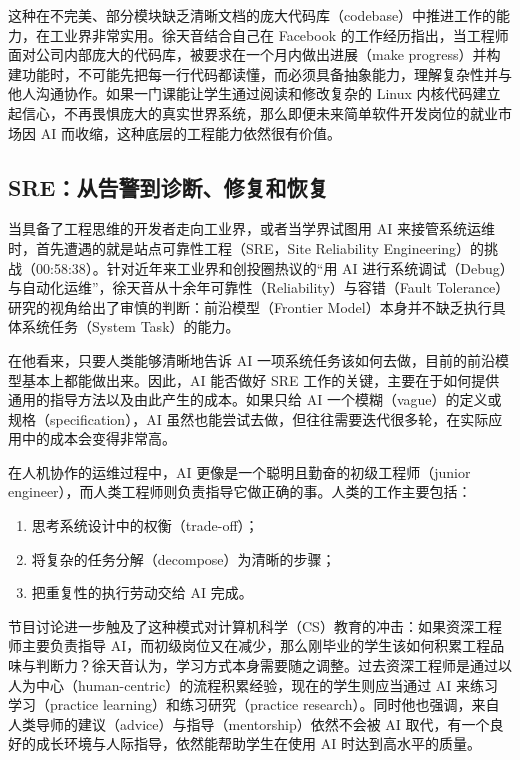 \documentclass[UTF8,a4paper,11pt,fontset=fandol]{ctexart}
\begin{document}
这种在不完美、部分模块缺乏清晰文档的庞大代码库（codebase）中推进工作的能力，在工业界非常实用。徐天音结合自己在 Facebook 的工作经历指出，当工程师面对公司内部庞大的代码库，被要求在一个月内做出进展（make progress）并构建功能时，不可能先把每一行代码都读懂，而必须具备抽象能力，理解复杂性并与他人沟通协作。如果一门课能让学生通过阅读和修改复杂的 Linux 内核代码建立起信心，不再畏惧庞大的真实世界系统，那么即便未来简单软件开发岗位的就业市场因 AI 而收缩，这种底层的工程能力依然很有价值。

\subsection{SRE：从告警到诊断、修复和恢复}
当具备了工程思维的开发者走向工业界，或者当学界试图用 AI 来接管系统运维时，首先遭遇的就是站点可靠性工程（SRE，Site Reliability Engineering）的挑战（00:58:38）。针对近年来工业界和创投圈热议的“用 AI 进行系统调试（Debug）与自动化运维”，徐天音从十余年可靠性（Reliability）与容错（Fault Tolerance）研究的视角给出了审慎的判断：前沿模型（Frontier Model）本身并不缺乏执行具体系统任务（System Task）的能力。

在他看来，只要人类能够清晰地告诉 AI 一项系统任务该如何去做，目前的前沿模型基本上都能做出来。因此，AI 能否做好 SRE 工作的关键，主要在于如何提供通用的指导方法以及由此产生的成本。如果只给 AI 一个模糊（vague）的定义或规格（specification），AI 虽然也能尝试去做，但往往需要迭代很多轮，在实际应用中的成本会变得非常高。

在人机协作的运维过程中，AI 更像是一个聪明且勤奋的初级工程师（junior engineer），而人类工程师则负责指导它做正确的事。人类的工作主要包括：
\begin{enumerate}
\item 思考系统设计中的权衡（trade-off）；
\item 将复杂的任务分解（decompose）为清晰的步骤；
\item 把重复性的执行劳动交给 AI 完成。
\end{enumerate}

节目讨论进一步触及了这种模式对计算机科学（CS）教育的冲击：如果资深工程师主要负责指导 AI，而初级岗位又在减少，那么刚毕业的学生该如何积累工程品味与判断力？徐天音认为，学习方式本身需要随之调整。过去资深工程师是通过以人为中心（human-centric）的流程积累经验，现在的学生则应当通过 AI 来练习学习（practice learning）和练习研究（practice research）。同时他也强调，来自人类导师的建议（advice）与指导（mentorship）依然不会被 AI 取代，有一个良好的成长环境与人际指导，依然能帮助学生在使用 AI 时达到高水平的质量。
\end{document}
